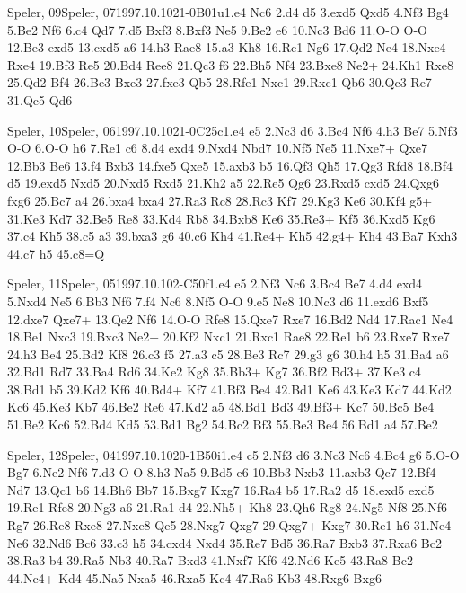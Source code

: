 \documentclass[twocolumn,a4paper,10pt]{report}
\begin{document}
\begin{chessgame}{Speler, 09}{Speler, 07}{1997.10.10}{2}{1-0}{B01u}{1.e4 Nc6 2.d4 d5 3.exd5 Qxd5 4.Nf3 Bg4 5.Be2 Nf6 6.c4 Qd7 7.d5 Bxf3 8.Bxf3 Ne5 9.Be2 e6 10.Nc3 Bd6 11.O-O O-O 12.Be3 exd5 13.cxd5 a6 14.h3 Rae8 15.a3 Kh8 16.Rc1 Ng6 17.Qd2 Ne4 18.Nxe4 Rxe4 19.Bf3 Re5 20.Bd4 Ree8 21.Qc3 f6 22.Bh5 Nf4 23.Bxe8 Ne2+ 24.Kh1 Rxe8 25.Qd2 Bf4 26.Be3 Bxe3 27.fxe3 Qb5 28.Rfe1 Nxc1 29.Rxc1 Qb6 30.Qc3 Re7 31.Qc5 Qd6}\end{chessgame}
\begin{chessgame}{Speler, 10}{Speler, 06}{1997.10.10}{2}{1-0}{C25c}{1.e4 e5 2.Nc3 d6 3.Bc4 Nf6 4.h3 Be7 5.Nf3 O-O 6.O-O h6 7.Re1 c6 8.d4 exd4 9.Nxd4 Nbd7 10.Nf5 Ne5 11.Nxe7+ Qxe7 12.Bb3 Be6 13.f4 Bxb3 14.fxe5 Qxe5 15.axb3 b5 16.Qf3 Qh5 17.Qg3 Rfd8 18.Bf4 d5 19.exd5 Nxd5 20.Nxd5 Rxd5 21.Kh2 a5 22.Re5 Qg6 23.Rxd5 cxd5 24.Qxg6 fxg6 25.Bc7 a4 26.bxa4 bxa4 27.Ra3 Rc8 28.Rc3 Kf7 29.Kg3 Ke6 30.Kf4 g5+ 31.Ke3 Kd7 32.Be5 Re8 33.Kd4 Rb8 34.Bxb8 Ke6 35.Re3+ Kf5 36.Kxd5 Kg6 37.c4 Kh5 38.c5 a3 39.bxa3 g6 40.c6 Kh4 41.Re4+ Kh5 42.g4+ Kh4 43.Ba7 Kxh3 44.c7 h5 45.c8=Q}\end{chessgame}
\begin{chessgame}{Speler, 11}{Speler, 05}{1997.10.10}{2}{\textonehalf-\textonehalf}{C50f}{1.e4 e5 2.Nf3 Nc6 3.Bc4 Be7 4.d4 exd4 5.Nxd4 Ne5 6.Bb3 Nf6 7.f4 Nc6 8.Nf5 O-O 9.e5 Ne8 10.Nc3 d6 11.exd6 Bxf5 12.dxe7 Qxe7+ 13.Qe2 Nf6 14.O-O Rfe8 15.Qxe7 Rxe7 16.Bd2 Nd4 17.Rac1 Ne4 18.Be1 Nxc3 19.Bxc3 Ne2+ 20.Kf2 Nxc1 21.Rxc1 Rae8 22.Re1 b6 23.Rxe7 Rxe7 24.h3 Be4 25.Bd2 Kf8 26.c3 f5 27.a3 c5 28.Be3 Rc7 29.g3 g6 30.h4 h5 31.Ba4 a6 32.Bd1 Rd7 33.Ba4 Rd6 34.Ke2 Kg8 35.Bb3+ Kg7 36.Bf2 Bd3+ 37.Ke3 c4 38.Bd1 b5 39.Kd2 Kf6 40.Bd4+ Kf7 41.Bf3 Be4 42.Bd1 Ke6 43.Ke3 Kd7 44.Kd2 Kc6 45.Ke3 Kb7 46.Be2 Re6 47.Kd2 a5 48.Bd1 Bd3 49.Bf3+ Kc7 50.Bc5 Be4 51.Be2 Kc6 52.Bd4 Kd5 53.Bd1 Bg2 54.Bc2 Bf3 55.Be3 Be4 56.Bd1 a4 57.Be2}\end{chessgame}
\begin{chessgame}{Speler, 12}{Speler, 04}{1997.10.10}{2}{0-1}{B50i}{1.e4 c5 2.Nf3 d6 3.Nc3 Nc6 4.Bc4 g6 5.O-O Bg7 6.Ne2 Nf6 7.d3 O-O 8.h3 Na5 9.Bd5 e6 10.Bb3 Nxb3 11.axb3 Qc7 12.Bf4 Nd7 13.Qc1 b6 14.Bh6 Bb7 15.Bxg7 Kxg7 16.Ra4 b5 17.Ra2 d5 18.exd5 exd5 19.Re1 Rfe8 20.Ng3 a6 21.Ra1 d4 22.Nh5+ Kh8 23.Qh6 Rg8 24.Ng5 Nf8 25.Nf6 Rg7 26.Re8 Rxe8 27.Nxe8 Qe5 28.Nxg7 Qxg7 29.Qxg7+ Kxg7 30.Re1 h6 31.Ne4 Ne6 32.Nd6 Bc6 33.c3 h5 34.cxd4 Nxd4 35.Re7 Bd5 36.Ra7 Bxb3 37.Rxa6 Bc2 38.Ra3 b4 39.Ra5 Nb3 40.Ra7 Bxd3 41.Nxf7 Kf6 42.Nd6 Ke5 43.Ra8 Bc2 44.Nc4+ Kd4 45.Na5 Nxa5 46.Rxa5 Kc4 47.Ra6 Kb3 48.Rxg6 Bxg6}\end{chessgame}
\end{document}
